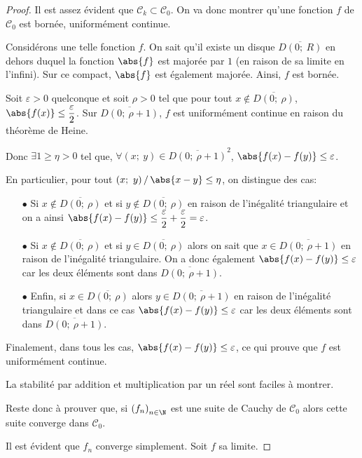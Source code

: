 \begin{proof}
Il est assez évident que $\mathcal{C}_k \subset \mathcal{C}_0$. On va donc montrer qu'une fonction $f$ de $\mathcal{C}_0$ est bornée, uniformément continue.

Considérons une telle fonction $f$. On sait qu'il existe un disque $\overline{D(0;~R)}$ en dehors duquel la fonction $\abs{f}$ est majorée par $1$ (en raison de sa limite en l'infini). Sur ce compact, $\abs{f}$ est également majorée. Ainsi, $f$ est bornée.

Soit $\varepsilon > 0$ quelconque et soit $\rho > 0$ tel que pour tout $x \notin \overline{D(0;~\rho)}$, $\abs{f(x)} \leq \dfrac{\varepsilon}{2}$. Sur $\overline{D(0;~\rho+1)}$, $f$ est uniformément continue en raison du théorème de Heine. 

Donc $\exists 1 \geq \eta >0$ tel que, $\forall (x;~y) \in \overline{D(0;~\rho+1)}^2$, $\abs{f(x)-f(y)} \leq \varepsilon$.

En particulier, pour tout $\left(x;~y\right)/ \, \abs{x-y} \leq \eta$, on distingue des cas:
\begin{itemize}
\item[$\bullet$] Si $x \notin \overline{D(0;~\rho)}$ et si $y \notin \overline{D(0;~\rho)}$ en raison de l'inégalité triangulaire et on a ainsi $\abs{f(x)-f(y)} \leq \dfrac{\varepsilon}{2}+\dfrac{\varepsilon}{2} = \varepsilon$.
\item[$\bullet$] Si $x \notin \overline{D(0;~\rho)}$ et si $y \in \overline{D(0;~\rho)}$ alors on sait que $x \in \overline{D(0;~\rho+1)}$ en raison de l'inégalité triangulaire. On a donc également $\abs{f(x)-f(y)} \leq \varepsilon$ car les deux éléments sont dans $\overline{D(0;~\rho+1)}$.
\item[$\bullet$] Enfin, si $x \in \overline{D(0;~\rho)}$ alors $y \in \overline{D(0;~\rho+1)}$ en raison de l'inégalité triangulaire et dans ce cas $\abs{f(x)-f(y)} \leq \varepsilon$ car les deux éléments sont dans $\overline{D(0;~\rho+1)}$.
\end{itemize}

Finalement, dans tous les cas, $\abs{f(x)-f(y)} \leq \varepsilon$, ce qui prouve que $f$ est uniformément continue.

La stabilité par addition et multiplication par un réel sont faciles à montrer.

Reste donc à prouver que, si $\left(f_n\right)_{n \in \N}$ est une suite de Cauchy de $\mathcal{C}_0$ alors cette suite converge dans $\mathcal{C}_0$.

Il est évident que $f_n$ converge simplement. Soit $f$ sa limite. 


\end{proof}
